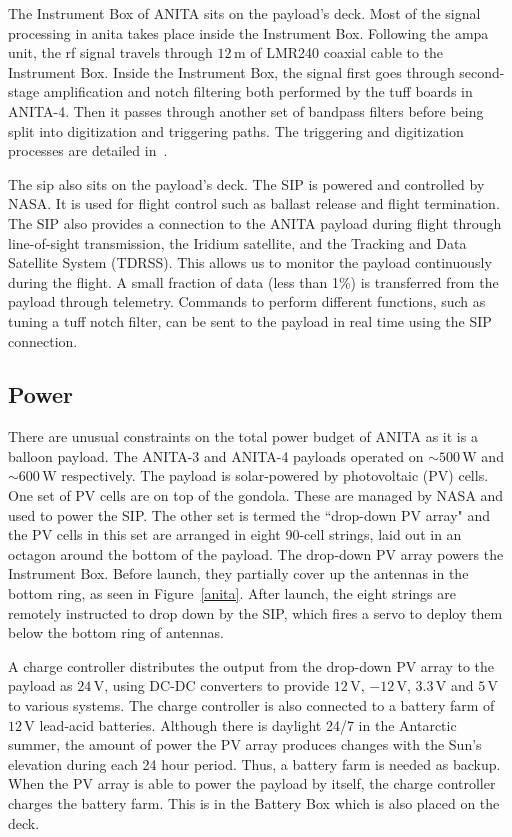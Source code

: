The Instrument Box of ANITA sits on the payload's deck. 
Most of the signal processing in \gls{anita} takes place inside the Instrument Box.  
Following the \gls{ampa} unit, the \gls{rf} signal travels through $12\,\mbox{m}$ of
LMR240 coaxial cable to the Instrument Box. 
Inside the Instrument Box, the signal first goes through second-stage amplification and notch filtering both performed by the \gls{tuff} boards in ANITA-4.
Then it passes through another set of bandpass filters before
being split into digitization and triggering paths. 
The triggering and digitization processes are detailed in~\cite{tuff}. 

The \gls{sip} also sits on the payload's deck. 
The SIP is powered and controlled by NASA.
It is used for flight control such as ballast release and flight termination. 
The SIP also provides a connection to the ANITA payload during flight through line-of-sight transmission, the Iridium satellite, and the Tracking and Data Satellite System (TDRSS). 
This allows us to monitor the payload continuously during the flight.
A small fraction of data (less than 1\%) is transferred from the payload through telemetry.
Commands to perform different functions, such as tuning a \gls{tuff} notch filter, 
can be sent to the payload in real time using the SIP connection. 

\subsection{Power}
\label{power}

There are unusual constraints on the total power budget of ANITA as it is a balloon payload. 
The ANITA-3 and ANITA-4 payloads operated on $\sim500\,\mathrm{W}$ and $\sim600\,\mathrm{W}$ respectively.
The payload is solar-powered by photovoltaic (PV) cells. 
One set of PV cells are on top of the gondola. 
These are managed by NASA and used to power the SIP. 
The other set is termed the ``drop-down PV array" and the PV cells in this set are arranged in eight 90-cell strings, laid out in an octagon around the bottom of
the payload. 
The drop-down PV array powers the Instrument Box. 
Before launch, they partially cover up the antennas in the bottom ring, as seen in Figure~\ref{anita}. 
After launch, the eight strings are remotely instructed to drop down by the SIP, which fires a servo to deploy them below the bottom ring of antennas. 

A charge controller distributes the output from the drop-down PV array to the payload as $24\,\mbox{V}$, using DC-DC converters 
to provide $12\,\mbox{V}$, $-12\,\mbox{V}$, $3.3\,\mbox{V}$ and $5\,\mbox{V}$ to various systems. 
The charge controller is also connected to a battery farm of $12\,\mbox{V}$ lead-acid batteries. 
Although there is daylight 24/7 in the Antarctic summer, the amount of power the PV array produces changes with the Sun's elevation during each 24 hour period. Thus, a battery farm is needed as backup. 
When the PV array is able to power the payload by itself, the charge controller charges the battery farm. 
This is in the Battery Box which is also placed on the deck. 

